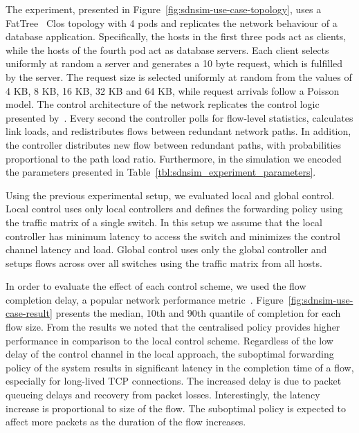 The experiment, presented in Figure~\ref{fig:sdnsim-use-case-topology}, uses a
FatTree~ Clos topology with 4 pods and replicates the network
behaviour of a database application. Specifically,  the hosts in the first three
pods act as clients, while the hosts of the fourth pod act as database servers.
Each client selects uniformly at random a server  and generates a 10 byte
request, which is fulfilled by the server. The request size is selected
uniformly at random from the values of 4 KB, 8 KB, 16 KB, 32 KB and 64 KB\@, while
request arrivals follow a Poisson model. The control architecture of the network
replicates the control logic presented by~.  Every second the
controller polls for flow-level statistics, calculates link loads, and
redistributes flows between redundant network paths. In addition, the controller
distributes new flow between redundant paths, with probabilities proportional to
the path load ratio. Furthermore, in the simulation we encoded the parameters
presented in Table~\ref{tbl:sdnsim_experiment_parameters}.

Using the previous experimental setup, we evaluated local and global control.
Local control uses only local controllers and defines the forwarding policy 
using the traffic matrix of a single switch. In this setup we assume that the local
controller has minimum latency to access the switch and minimizes the control
channel latency and load. Global control uses only the global controller and
setups flows across over all switches using the traffic matrix from all hosts.


In order to evaluate the effect of each control scheme, we used the flow
completion delay, a popular network performance metric~. 
Figure~\ref{fig:sdnsim-use-case-result} presents the median, 10th and 90th
quantile of completion for each flow size. From the results we noted that the
centralised policy provides higher performance in comparison to the local
control scheme. Regardless of the low delay of the control channel in the local
approach, the suboptimal forwarding policy of the system results in significant
latency in the completion time of a flow, especially for long-lived TCP
connections. The increased delay is due to packet queueing delays and recovery
from packet losses.  Interestingly, the latency increase is proportional to size
of the flow. The suboptimal policy is expected to affect more packets as the
duration of the flow increases. 

